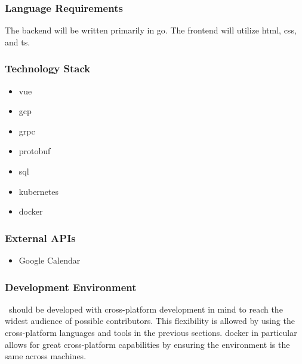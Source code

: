         \subsubsection{Language Requirements}\label{sec:language-requirements}
            The backend will be written primarily in \gls{go}. The frontend will utilize \acrshort{html}, \acrshort{css}, and \acrfull{ts}.
        \subsubsection{Technology Stack}\label{sec:technology-stack}
            \begin{itemize}
                \item \gls{vue}
                \item \acrfull{gcp}
                \item \gls{grpc}
                \item \acrfull{protobuf}
                \item \acrfull{sql}
                \item \gls{kubernetes}
                \item \gls{docker}
            \end{itemize}
        \subsubsection{External APIs}\label{sec:external-apis}
            \begin{itemize}
                \item Google Calendar
            \end{itemize}
        \subsubsection{Development Environment}\label{sec:development-environment}
            \projectName\ should be developed with cross-platform development in mind to reach the widest audience of possible contributors. This flexibility is allowed by using the cross-platform languages and tools in the previous sections. \Gls{docker} in particular allows for great cross-platform capabilities by ensuring the environment is the same across machines.
